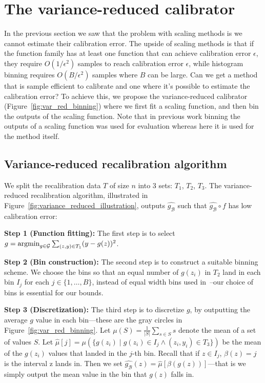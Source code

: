 \section{The variance-reduced calibrator}
\label{sec:calibrating_models}

In the previous section we saw that the problem with scaling methods is we cannot estimate their calibration error. The upside of scaling methods is that if the function family has at least one function that can achieve calibration error $\epsilon$, they require $O(1/\epsilon^2)$ samples to reach calibration error $\epsilon$, while histogram binning requires $O(B/\epsilon^2)$ samples where $B$ can be large. Can we get a method that is sample efficient to calibrate and one where it's possible to estimate the calibration error? To achieve this, we propose the variance-reduced calibrator (Figure~\ref{fig:var_red_binning}) where we first fit a scaling function, and then bin the outputs of the scaling function. Note that in previous work binning the outputs of a scaling function was used for evaluation whereas here it is used for the method itself.

\subsection{Variance-reduced recalibration algorithm}

We split the recalibration data $T$ of size $n$ into 3 sets: $T_1$, $T_2$, $T_3$. The variance-reduced recalibration algorithm, illustrated in Figure~\ref{fig:variance_reduced_illustration}, outputs $\hat{g_{\mathcal{B}}}$ such that $\hat{g_{\mathcal{B}}} \circ f$ has low calibration error:

\textbf{Step 1 (Function fitting):} The first step is to select $g = \mathop{\mbox{argmin}}_{g \in \mathcal{G}} \sum_{(z, y) \in T_1} (y - g(z))^2$.

\textbf{Step 2 (Bin construction):} The second step is to construct a suitable binning scheme. We choose the bins so that an equal number of $g(z_i)$ in $T_2$ land in each bin $I_j$ for each $j \in \{1, \dots, B\}$, instead of equal width bins used in~\cite{guo2017calibration}--our choice of bins is essential for our bounds.

\textbf{Step 3 (Discretization):} The third step is to discretize $g$, by outputting the average $g$ value in each bin---these are the gray circles in Figure~\ref{fig:var_red_binning}. Let $\mu(S) = \frac{1}{|S|} \sum_{s \in S} s$ denote the mean of a set of values $S$.
Let $\hat{\mu}[j] = \mu(\{ g(z_i) \; | \; g(z_i) \in I_j \wedge (z_i, y_i) \in T_3 \})$ be the mean of the $g(z_i)$ values that landed in the $j$-th bin.
Recall that if $z \in I_j$, $\beta(z) = j$ is the interval z lands in.
Then we set $\hat{g_{\mathcal{B}}}(z) = \hat{\mu}[\beta(g(z))]$---that is we simply output the mean value in the bin that $g(z)$ falls in.

